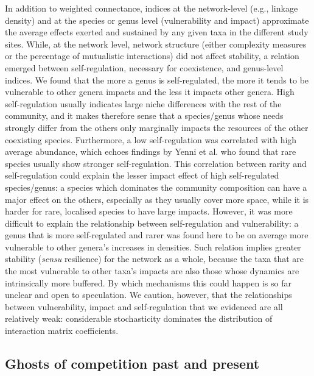 \documentclass[9pt,twocolumn,twoside,lineno]{pnas-new}
\begin{document}
In addition to weighted connectance, indices at the network-level
(e.g., linkage density) and at the species or genus level (vulnerability
and impact) approximate the average effects exerted and sustained
by any given taxa in the different study sites. While, at the network
level, network structure (either complexity measures or the percentage
of mutualistic interactions) did not affect stability, a relation
emerged between self-regulation, necessary for coexistence, and genus-level
indices. We found that the more a genus is self-regulated, the more
it tends to be vulnerable to other genera impacts and the less it
impacts other genera. High self-regulation usually indicates large
niche differences with the rest of the community, and it makes therefore
sense that a species/genus whose needs strongly differ from the others
only marginally impacts the resources of the other coexisting species.
Furthermore, a low self-regulation was correlated with high average
abundance, which echoes findings by Yenni et al.\cite{yenni_persistent_2017}
who found that rare species usually show stronger self-regulation.
This correlation between rarity and self-regulation could explain
the lesser impact effect of high self-regulated species/genus: a species
which dominates the community composition can have a major effect
on the others, especially as they usually cover more space, while
it is harder for rare, localised species to have large impacts. However,
it was more difficult to explain the relationship between self-regulation
and vulnerability: a genus that is more self-regulated and rarer was
found here to be on average more vulnerable to other genera's increases
in densities. Such relation implies greater stability (\emph{sensu}
resilience) for the network as a whole, because the taxa that are
the most vulnerable to other taxa's impacts are also those whose dynamics
are intrinsically more buffered. By which mechanisms this could happen
is so far unclear and open to speculation. We caution, however, that
the relationships between vulnerability, impact and self-regulation
that we evidenced are all relatively weak: considerable stochasticity
dominates the distribution of interaction matrix coefficients.

\subsection*{Ghosts of competition past and present}
\end{document}
